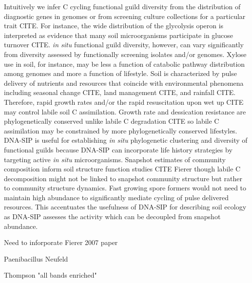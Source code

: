 Intuitively we infer C cycling functional guild diversity from the distribution
of diagnostic genes in genomes or from screening culture collections for
a particular trait CITE. For instance, the wide distribution of the
glycolysis operon is interpreted as evidence that many soil microorganisms
participate in glucose turnover CITE. \textit{in situ} functional guild
diversity, however, can vary significantly from diversity assessed by
functionally screening isolates and/or genomes. Xylose use in soil, for
instance, may be less a function of catabolic pathway distribution among
genomes and more a function of lifestyle. Soil is characterized by pulse
delivery of nutrients and resources that coincide with environmental phenomena
including seasonal change CITE, land management CITE, and rainfall CITE.
Therefore, rapid growth rates and/or the rapid resuscitation upon wet up CITE
may control labile soil C assimilation. Growth rate and dessication resistance
are phylogenetically conserved unlike labile C degradation CITE so labile
C assimilation may be constrained by more phylogenetically conserved
lifestyles. DNA-SIP is useful for establishing \textit{in situ} phylogenetic
clustering and diversity of functional guilds because DNA-SIP can incorporate
life history strategies by targeting active \textit{in situ} microorganisms.
Snapshot estimates of community composition inform soil structure function
studies CITE Fierer though labile C decomposition might not be linked to
snapshot community structure but rather to community structure dynamics. Fast
growing spore formers would not need to maintain high abundance
to significantly mediate cycling of pulse delivered resources. This accentuates
the usefulness of DNA-SIP for describing soil ecology as DNA-SIP assesses the
activity which can be decoupled from snapshot abundance. 

Need to inforporate Fierer 2007 paper

Paenibacillus Neufeld

Thompson "all bands enriched"

